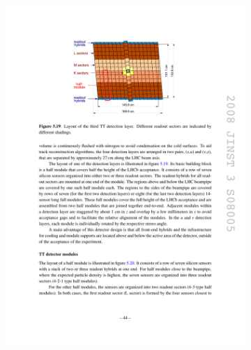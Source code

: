 \begin{figure}[!h]
    \centering
    \begin{subfigure}[m]{0.49\textwidth}
        \centering
        \includegraphics[width=1.0\textwidth]{figs/Detector/tt_layout.pdf}
    \end{subfigure}
    \begin{subfigure}[m]{0.49\textwidth}
        \centering

\end{subfigure}
\end{figure}
